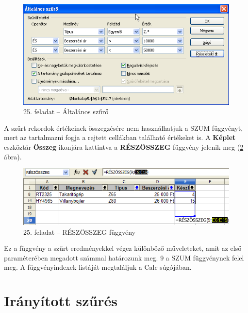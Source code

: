 \begin{figure}[!h]
\begin{center}
\includegraphics[width=13.452cm]{oocalcv2-img116.png}
\caption{25. feladat --  Általános szűrő}\label{25-feladatÁltalános}
\end{center}
\end{figure}

A szűrt rekordok értékeinek összegzésére nem
használhatjuk a SZUM függvényt, mert az tartalmazni fogja a
rejtett cellákban található értékeket is. A \textbf{Képlet}
eszköztár \textbf{Összeg} ikonjára kattintva a
\textbf{RÉSZÖSSZEG} függvény jelenik meg (\ref{25-feladatSUBTOTAL} ábra).

\begin{figure}[!h]
\begin{center}
\includegraphics[width=13.868cm]{oocalcv2-img117.png}
\caption{25. feladat --  RÉSZÖSSZEG függvény}\label{25-feladatSUBTOTAL}
\end{center}
\end{figure}

Ez a függvény a szűrt eredményekkel végez
különböző műveleteket, amit az első paraméterében
megadott számmal határozunk meg. 9 a SZUM függvénynek felel meg.
A függvényindexek listáját megtaláljuk a Calc
súgójában.


\section{Irányított szűrés}

